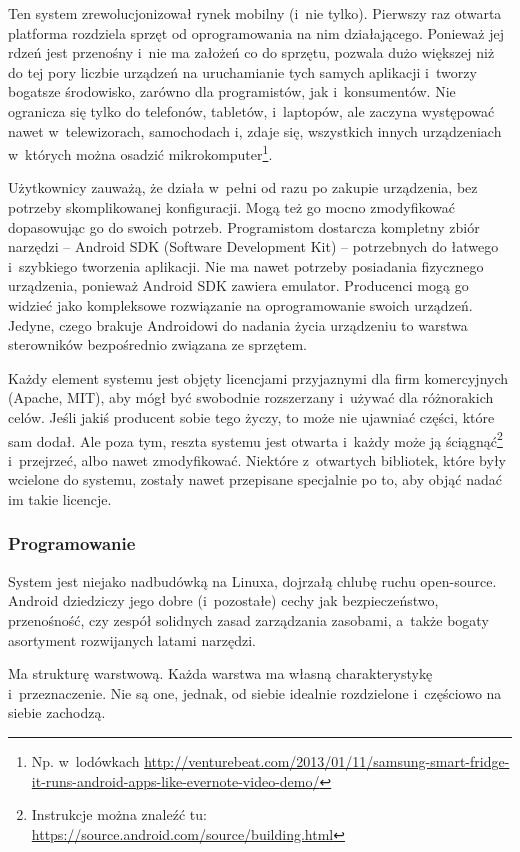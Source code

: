 Ten system zrewolucjonizował rynek mobilny (i~nie tylko). Pierwszy raz otwarta platforma rozdziela sprzęt od oprogramowania na nim działającego. Ponieważ jej rdzeń jest przenośny i~nie ma założeń co do sprzętu, pozwala dużo większej niż do tej pory liczbie urządzeń na uruchamianie tych samych aplikacji i~tworzy bogatsze środowisko, zarówno dla programistów, jak i~konsumentów. Nie ogranicza się tylko do telefonów, tabletów, i~laptopów, ale zaczyna występować nawet w~telewizorach, samochodach i, zdaje się, wszystkich innych urządzeniach w~których można osadzić mikrokomputer\footnote{Np. w~lodówkach \url{http://venturebeat.com/2013/01/11/samsung-smart-fridge-it-runs-android-apps-like-evernote-video-demo/}}.

Użytkownicy zauważą, że działa w~pełni od razu po zakupie urządzenia, bez potrzeby skomplikowanej konfiguracji. Mogą też go mocno zmodyfikować dopasowując go do swoich potrzeb.
Programistom dostarcza kompletny zbiór narzędzi -- Android SDK (Software Development Kit) -- potrzebnych do łatwego i~szybkiego tworzenia aplikacji. Nie ma nawet potrzeby posiadania fizycznego urządzenia, ponieważ Android SDK zawiera emulator.
Producenci mogą go widzieć jako kompleksowe rozwiązanie na oprogramowanie swoich urządzeń. Jedyne, czego brakuje Androidowi do nadania życia urządzeniu to warstwa sterowników bezpośrednio związana ze sprzętem.

Każdy element systemu jest objęty licencjami przyjaznymi dla firm komercyjnych (Apache, MIT), aby mógł być swobodnie rozszerzany i~używać dla różnorakich celów.
Jeśli jakiś producent sobie tego życzy, to może nie ujawniać części, które sam dodał. Ale poza tym, reszta systemu jest otwarta i~każdy może ją ściągnąć\footnote{Instrukcje można znaleźć tu: \url{https://source.android.com/source/building.html}} i~przejrzeć, albo nawet zmodyfikować.
Niektóre z~otwartych bibliotek, które były wcielone do systemu, zostały nawet przepisane specjalnie po to, aby objąć nadać im takie licencje.

\subsubsection{Programowanie}
System jest niejako nadbudówką na Linuxa, dojrzałą chlubę ruchu open-source. Android dziedziczy jego dobre (i~pozostałe) cechy jak bezpieczeństwo, przenośność, czy zespół solidnych zasad zarządzania zasobami, a~także bogaty asortyment rozwijanych latami narzędzi.

Ma strukturę warstwową. Każda warstwa ma własną charakterystykę i~przeznaczenie. Nie są one, jednak, od siebie idealnie rozdzielone i~częściowo na siebie zachodzą.

